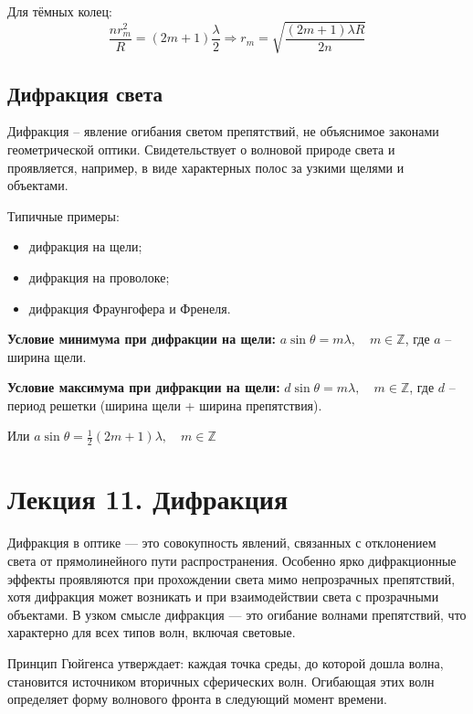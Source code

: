 \documentclass[12pt]{article}
\begin{document}
Для тёмных колец:
\[
\frac{n r_m^2}{R} = (2m + 1)\frac{\lambda}{2} \Rightarrow r_m = \sqrt{\frac{(2m + 1)\lambda R}{2n}}
\]

\subsection{Дифракция света}

Дифракция -- явление огибания светом препятствий, не объяснимое законами геометрической оптики. Свидетельствует о волновой природе света и проявляется, например, в виде характерных полос за узкими щелями и объектами.

Типичные примеры:
\begin{itemize}
  \item дифракция на щели;
  \item дифракция на проволоке;
  \item дифракция Фраунгофера и Френеля.
\end{itemize}

\textbf{Условие минимума при дифракции на щели:} $a \sin \theta = m \lambda, \quad m \in \mathbb{Z}$, где $a$ -- ширина щели.

\textbf{Условие максимума при дифракции на щели:} $d \sin \theta = m \lambda, \quad m \in \mathbb{Z}$, где $d$ -- период решетки (ширина щели + ширина препятствия).

Или $a \sin \theta = \frac{1}{2} (2m + 1) \lambda, \quad m \in \mathbb{Z}$







\section{Лекция 11. Дифракция}

Дифракция в оптике — это совокупность явлений, связанных с отклонением света от прямолинейного пути распространения. Особенно ярко дифракционные эффекты проявляются при прохождении света мимо непрозрачных препятствий, хотя дифракция может возникать и при взаимодействии света с прозрачными объектами. В узком смысле дифракция — это огибание волнами препятствий, что характерно для всех типов волн, включая световые.

Принцип Гюйгенса утверждает: каждая точка среды, до которой дошла волна, становится источником вторичных сферических волн. Огибающая этих волн определяет форму волнового фронта в следующий момент времени.
\end{document}
